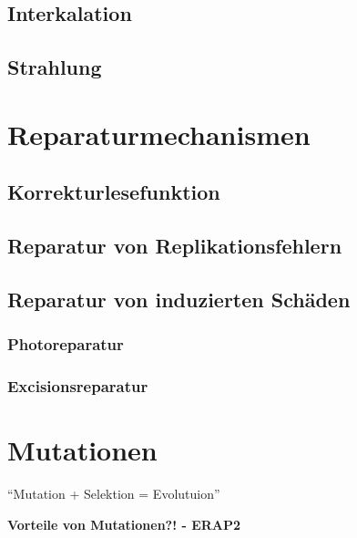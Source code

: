 \subsection{Interkalation}\label{subsec:interkalation}
\begin{bsp}
\end{bsp}
\subsection{Strahlung}\label{subsec:strahlung}
\begin{bsp}
\end{bsp}

\section{Reparaturmechanismen}\label{sec:reparaturmechanismen}

\subsection{Korrekturlesefunktion}\label{subsec:korrekturlesefunktion}
\subsection{Reparatur von Replikationsfehlern}\label{subsec:reparatur-von-replikationsfehlern}
\subsection{Reparatur von induzierten Schäden}\label{subsec:reparatur-von-induzierten-schaden}

\subsubsection{Photoreparatur}
\subsubsection{Excisionsreparatur}



\section{Mutationen}\label{sec:mutationen}
\begin{center}
    ``Mutation + Selektion = Evolutuion''
\end{center}
\begin{bsp} \textbf{Vorteile von Mutationen?! - ERAP2}
\end{bsp}

